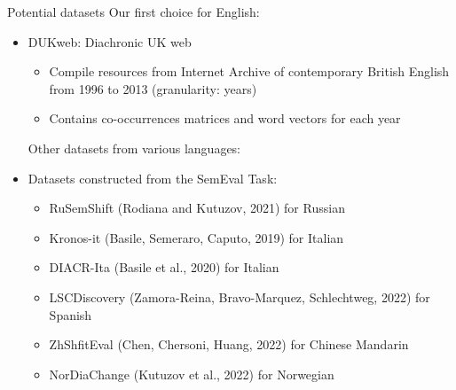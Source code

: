 \documentclass[10pt]{beamer}
\begin{document}
\begin{frame}{Potential datasets}
Our first choice for English: 
    \begin{itemize}
        \item DUKweb: Diachronic UK web 
        \begin{itemize}
            \item Compile resources from Internet Archive of contemporary British English from 1996 to 2013 (granularity: years)
            \item Contains co-occurrences matrices and word vectors for each year 
        \end{itemize}

Other datasets from various languages:
        \item Datasets constructed from the SemEval Task:
        \begin{itemize}
            \item RuSemShift (Rodiana and Kutuzov, 2021) for Russian
            \item Kronos-it (Basile, Semeraro, Caputo, 2019) for Italian
            \item DIACR-Ita (Basile et al., 2020) for Italian
            \item LSCDiscovery (Zamora-Reina, Bravo-Marquez, Schlechtweg, 2022) for Spanish
            \item ZhShfitEval (Chen, Chersoni, Huang, 2022) for Chinese Mandarin 
            \item NorDiaChange (Kutuzov et al., 2022) for Norwegian
        \end{itemize}
    \end{itemize}
\end{frame}
\end{document}
